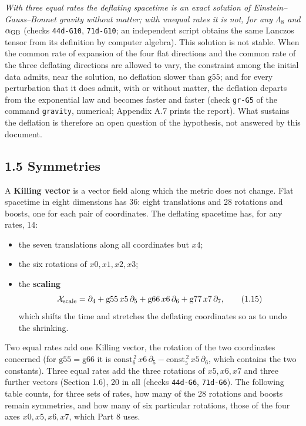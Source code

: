 \documentclass[
  10pt,
]{article}
\providecommand{\tightlist}{%
  \setlength{\itemsep}{0pt}\setlength{\parskip}{0pt}}
\begin{document}
\emph{With three equal rates the deflating spacetime is an exact
solution of Einstein--Gauss--Bonnet gravity without matter; with unequal
rates it is not, for any \(\Lambda_8\) and \(\alpha_{\rm GB}\)} (checks
\texttt{44d-G10}, \texttt{71d-G10}; an independent script obtains the
same Lanczos tensor from its definition by computer algebra). This
solution is not stable. When the common rate of expansion of the four
flat directions and the common rate of the three deflating directions
are allowed to vary, the constraint among the initial data admits, near
the solution, no deflation slower than \(\mathrm{g55}\); and for every
perturbation that it does admit, with or without matter, the deflation
departs from the exponential law and becomes faster and faster (check
\texttt{gr-G5} of the command \texttt{gravity}, numerical; Appendix A.7
prints the report). What sustains the deflation is therefore an open
question of the hypothesis, not answered by this document.

\hypertarget{symmetries}{%
\subsection{1.5 Symmetries}\label{symmetries}}

A \textbf{Killing vector} is a vector field along which the metric does
not change. Flat spacetime in eight dimensions has 36: eight
translations and 28 rotations and boosts, one for each pair of
coordinates. The deflating spacetime has, for any rates, 14:

\begin{itemize}
\tightlist
\item
  the seven translations along all coordinates but \(x4\);
\item
  the six rotations of \(x0,x1,x2,x3\);
\item
  the \textbf{scaling}
  \[\mathcal X_{\rm scale}=\partial_4+\mathrm{g55}\,x5\,\partial_5+\mathrm{g66}\,x6\,\partial_6+\mathrm{g77}\,x7\,\partial_7,\tag{1.15}\]
  which shifts the time and stretches the deflating coordinates so as to
  undo the shrinking.
\end{itemize}

Two equal rates add one Killing vector, the rotation of the two
coordinates concerned (for \(\mathrm{g55}=\mathrm{g66}\) it is
\(\mathrm{const}_6^{\,2}\,x6\,\partial_5-\mathrm{const}_5^{\,2}\,x5\,\partial_6\),
which contains the two constants). Three equal rates add the three
rotations of \(x5,x6,x7\) and three further vectors (Section 1.6), 20 in
all (checks \texttt{44d-G6}, \texttt{71d-G6}). The following table
counts, for three sets of rates, how many of the 28 rotations and boosts
remain symmetries, and how many of six particular rotations, those of
the four axes \(x0,x5,x6,x7\), which Part 8 uses.
\end{document}
